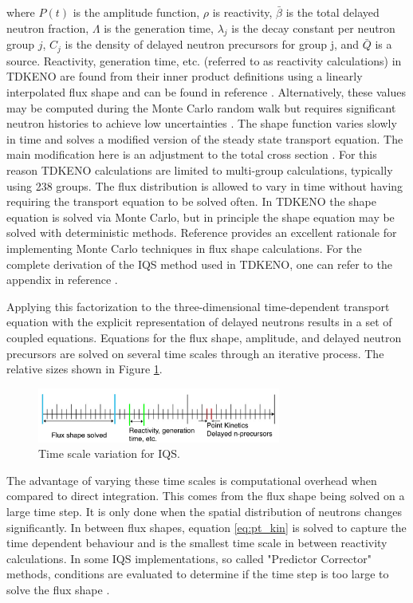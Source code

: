 \documentclass{anstrans}
\begin{document}
where $P(t)$ is the amplitude function, $\rho$ is reactivity, $\bar{\beta}$ is the total delayed neutron fraction, $\Lambda$ is the generation time, $\lambda_j$ is the decay constant per neutron group $j$, $C_j$ is the density of delayed neutron precursors for group j, and $\bar{Q}$ is a source.  
 Reactivity, generation time, etc. (referred to as reactivity calculations) in TDKENO are found from their inner product definitions using a linearly interpolated flux shape and can be found in reference \cite{Bentley}.  Alternatively, these values may be computed during the Monte Carlo random walk but requires significant neutron histories to achieve low uncertainties \cite{Waddell}.  The shape function varies slowly in time and solves a modified version of the steady state transport equation.  The main modification here is an adjustment to the total cross section \cite{goluoglu2001time}\cite{Gehin}.  For this reason TDKENO calculations are limited to multi-group calculations, typically using 238 groups.  The flux distribution is allowed to vary in time without having requiring the transport equation to be solved often.  In TDKENO the shape equation is solved via Monte Carlo, but in principle the shape equation may be solved with deterministic methods.  Reference \cite{Shayesteh} provides an excellent rationale for implementing Monte Carlo techniques in flux shape calculations.  For the complete derivation of the IQS method used in TDKENO, one can refer to the appendix in reference \cite{Bentley}. 

Applying this factorization to the three-dimensional time-dependent transport equation with the explicit representation of delayed neutrons results in a set of coupled equations.  Equations for the flux shape, amplitude, and delayed neutron precursors are solved on several time scales through an iterative process. The relative sizes shown in Figure \ref{fig:time_scale}. 

\begin{figure}[h]
    \centering
    \includegraphics[width=8cm]{figures/time_scale.pdf}
    \caption{Time scale variation for IQS.}
    \label{fig:time_scale}
\end{figure}

The advantage of varying these time scales is computational overhead when compared to direct integration.  This comes from the flux shape being solved on a large time step. It is only done when the spatial distribution of neutrons changes significantly.  In between flux shapes, equation \ref{eq:pt_kin} is solved to capture the time dependent behaviour and is the smallest time scale in between reactivity calculations.  In some IQS implementations, so called "Predictor Corrector" methods, conditions are evaluated to determine if the time step is too large to solve the flux shape \cite{Dulla}.  
\end{document}
